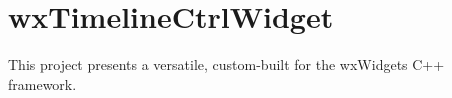 \chapter{wx\+Timeline\+Ctrl\+Widget}
\hypertarget{md_README}{}\label{md_README}
\label{md_README_autotoc_md4}%
%
This project presents a versatile, custom-\/built  for the wx\+Widgets C++ framework. 